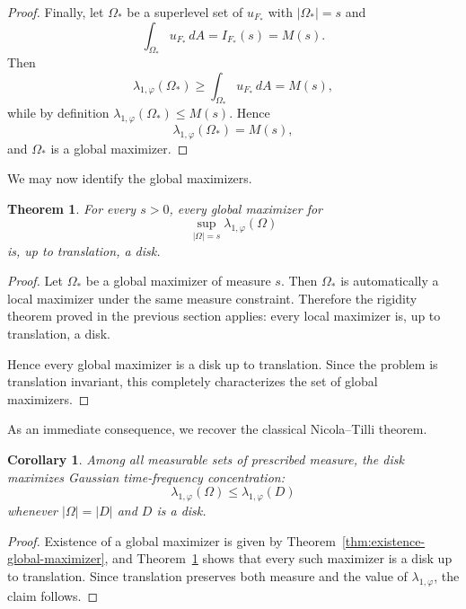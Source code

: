 \documentclass[a4paper,11pt,reqno]{amsart}
\numberwithin{equation}{section}
\theoremstyle{plain} %
\newtheorem{theorem}{Theorem}
\newtheorem{corollary}{Corollary}[section]
\theoremstyle{definition} %
\theoremstyle{remark}
\begin{document}
\begin{proof}
Finally, let \(\Omega_*\) be a superlevel set of \(u_{F_*}\) with \(|\Omega_*|=s\)
and
\[
\int_{\Omega_*}u_{F_*}\,dA=I_{F_*}(s)=M(s).
\]
Then
\[
\lambda_{1,\varphi}(\Omega_*)\ge \int_{\Omega_*}u_{F_*}\,dA=M(s),
\]
while by definition \(\lambda_{1,\varphi}(\Omega_*)\le M(s)\). Hence
\[
\lambda_{1,\varphi}(\Omega_*)=M(s),
\]
and \(\Omega_*\) is a global maximizer.
\end{proof}

We may now identify the global maximizers.

\begin{theorem}\label{thm:global-maximizers-are-disks}
For every \(s>0\), every global maximizer for
\[
\sup_{|\Omega|=s}\lambda_{1,\varphi}(\Omega)
\]
is, up to translation, a disk.
\end{theorem}

\begin{proof}
Let \(\Omega_*\) be a global maximizer of measure \(s\). Then \(\Omega_*\) is
automatically a local maximizer under the same measure constraint. Therefore the
rigidity theorem proved in the previous section applies: every local maximizer is,
up to translation, a disk.

Hence every global maximizer is a disk up to translation. Since the problem is
translation invariant, this completely characterizes the set of global maximizers.
\end{proof}

As an immediate consequence, we recover the classical Nicola--Tilli theorem.

\begin{corollary}
Among all measurable sets of prescribed measure, the disk maximizes Gaussian
time-frequency concentration:
\[
\lambda_{1,\varphi}(\Omega)\le \lambda_{1,\varphi}(D)
\]
whenever \(|\Omega|=|D|\) and \(D\) is a disk.
\end{corollary}

\begin{proof}
Existence of a global maximizer is given by
Theorem~\ref{thm:existence-global-maximizer}, and
Theorem~\ref{thm:global-maximizers-are-disks} shows that every such maximizer is a
disk up to translation. Since translation preserves both measure and the value of
\(\lambda_{1,\varphi}\), the claim follows.
\end{proof}



\end{document}

